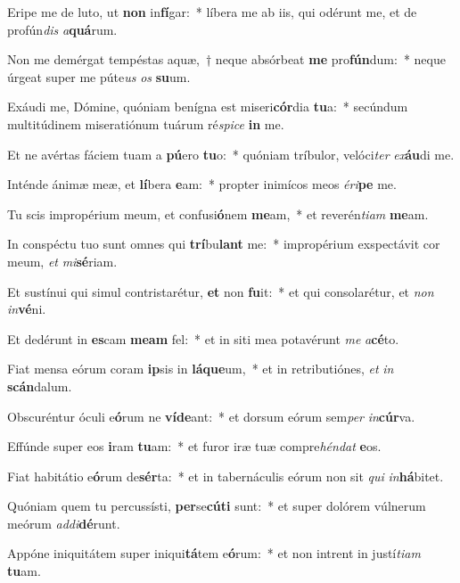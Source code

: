 \item Eripe me de luto, ut \textbf{non} in\textbf{fí}gar:~* líbera me ab iis, qui odérunt me, et de profún\textit{dis} \textit{a}\textbf{quá}rum.
\item Non me demérgat tempéstas aquæ,~† neque absórbeat \textbf{me} pro\textbf{fún}dum:~* neque úrgeat super me púte\textit{us} \textit{os} \textbf{su}um.
\item Exáudi me, Dómine, quóniam benígna est miseri\textbf{cór}dia \textbf{tu}a:~* secúndum multitúdinem miseratiónum tuárum ré\textit{spi}\textit{ce} \textbf{in} me.
\item Et ne avértas fáciem tuam a \textbf{pú}ero \textbf{tu}o:~* quóniam tríbulor, velóci\textit{ter} \textit{ex}\textbf{áu}di me.
\item Inténde ánimæ meæ, et \textbf{lí}bera \textbf{e}am:~* propter inimícos meos \textit{é}\textit{ri}\textbf{pe} me.
\item Tu scis impropérium meum, et confusi\textbf{ó}nem \textbf{me}am,~* et reverén\textit{ti}\textit{am} \textbf{me}am.
\item In conspéctu tuo sunt omnes qui \textbf{trí}bu\textbf{lant} me:~* impropérium exspectávit cor meum, \textit{et} \textit{mi}\textbf{sé}riam.
\item Et sustínui qui simul contristarétur, \textbf{et} non \textbf{fu}it:~* et qui consolarétur, et \textit{non} \textit{in}\textbf{vé}ni.
\item Et dedérunt in \textbf{es}cam \textbf{me}\textbf{am} fel:~* et in siti mea potavérunt \textit{me} \textit{a}\textbf{cé}to.
\item Fiat mensa eórum coram \textbf{ip}sis in \textbf{lá}\textbf{que}um,~* et in retributiónes, \textit{et} \textit{in} \textbf{scán}dalum.
\item Obscuréntur óculi e\textbf{ó}rum ne \textbf{ví}\textbf{de}ant:~* et dorsum eórum sem\textit{per} \textit{in}\textbf{cúr}va.
\item Effúnde super eos \textbf{i}ram \textbf{tu}am:~* et furor iræ tuæ compre\textit{hén}\textit{dat} \textbf{e}os.
\item Fiat habitátio e\textbf{ó}rum de\textbf{sér}ta:~* et in tabernáculis eórum non sit \textit{qui} \textit{in}\textbf{há}bitet.
\item Quóniam quem tu percussísti, \textbf{per}se\textbf{cú}\textbf{ti} sunt:~* et super dolórem vúlnerum meórum \textit{ad}\textit{di}\textbf{dé}runt.
\item Appóne iniquitátem super iniqui\textbf{tá}tem e\textbf{ó}rum:~* et non intrent in justí\textit{ti}\textit{am} \textbf{tu}am.
